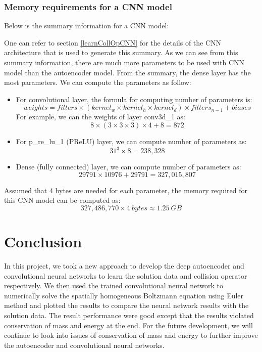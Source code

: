 \documentclass{article}
\begin{document}
\subsubsection{Memory requirements for a CNN model}
Below is the summary information for a CNN model:

One can refer to section \ref{learnCollOpCNN} for the details of the CNN architecture that is used to generate this summary.
As we can see from this summary information, there are much more parameters to be used with CNN model than the autoencoder model.
From the summary, the dense layer has the most parameters. We can compute the parameters as follow:
\begin{itemize}
	\item For convolutional layer, the formula for computing number of parameters is:
	\[ weights = filters \times (kernel_w \times kernel_h \times kernel_d) \times filters_{n-1} + biases \]
	For example, we can the weights of layer conv3d\_1 as:
	\[ 8 \times (3 \times 3 \times 3) \times 4 + 8 = 872 \]
	\item For p\_re\_lu\_1 (PReLU) layer, we can compute number of parameters as:
	\[ 31^3 \times 8 = 238,328 \] 
	\item Dense (fully connected) layer, we can compute number of parameters as:
	\[ 29791 \times 10976 + 29791 = 327,015,807 \]
	
\end{itemize}
Assumed that 4 bytes are needed for each parameter, the memory required for this CNN model can be computed as:
\[ 327,486,770 \times 4 \ bytes \approx 1.25 \  GB \]

\section{Conclusion} \label{Conclusion}
In this project, we took a new approach to develop the deep autoencoder and convolutional neural networks to learn the solution data and collision operator respectively. We then used the trained convolutional neural network to numerically solve the spatially homogeneous Boltzmann equation using Euler method and plotted the results to compare the neural network results with the solution data. The result performance were good except that the results violated conservation of mass and energy at the end. For the future development, we will continue to look into issues of conservation of mass and energy to further improve the autoencoder and convolutional neural networks.
 
\appendix
\appendixpage
\end{document}
